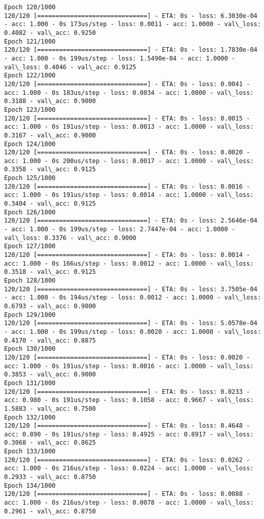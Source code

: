 \documentclass[11pt]{article}
\begin{document}
\begin{Verbatim}[commandchars=\\\{\}]
Epoch 120/1000
120/120 [==============================] - ETA: 0s - loss: 6.3030e-04 - acc: 1.000 - 0s 173us/step - loss: 0.0011 - acc: 1.0000 - val\_loss: 0.4082 - val\_acc: 0.9250
Epoch 121/1000
120/120 [==============================] - ETA: 0s - loss: 1.7830e-04 - acc: 1.000 - 0s 199us/step - loss: 1.5490e-04 - acc: 1.0000 - val\_loss: 0.4046 - val\_acc: 0.9125
Epoch 122/1000
120/120 [==============================] - ETA: 0s - loss: 0.0041 - acc: 1.000 - 0s 183us/step - loss: 0.0034 - acc: 1.0000 - val\_loss: 0.3188 - val\_acc: 0.9000
Epoch 123/1000
120/120 [==============================] - ETA: 0s - loss: 0.0015 - acc: 1.000 - 0s 191us/step - loss: 0.0013 - acc: 1.0000 - val\_loss: 0.3167 - val\_acc: 0.9000
Epoch 124/1000
120/120 [==============================] - ETA: 0s - loss: 0.0020 - acc: 1.000 - 0s 200us/step - loss: 0.0017 - acc: 1.0000 - val\_loss: 0.3358 - val\_acc: 0.9125
Epoch 125/1000
120/120 [==============================] - ETA: 0s - loss: 0.0016 - acc: 1.000 - 0s 191us/step - loss: 0.0014 - acc: 1.0000 - val\_loss: 0.3404 - val\_acc: 0.9125
Epoch 126/1000
120/120 [==============================] - ETA: 0s - loss: 2.5646e-04 - acc: 1.000 - 0s 199us/step - loss: 2.7447e-04 - acc: 1.0000 - val\_loss: 0.3376 - val\_acc: 0.9000
Epoch 127/1000
120/120 [==============================] - ETA: 0s - loss: 0.0014 - acc: 1.000 - 0s 166us/step - loss: 0.0012 - acc: 1.0000 - val\_loss: 0.3518 - val\_acc: 0.9125
Epoch 128/1000
120/120 [==============================] - ETA: 0s - loss: 3.7505e-04 - acc: 1.000 - 0s 194us/step - loss: 0.0012 - acc: 1.0000 - val\_loss: 0.6793 - val\_acc: 0.9000
Epoch 129/1000
120/120 [==============================] - ETA: 0s - loss: 5.0578e-04 - acc: 1.000 - 0s 199us/step - loss: 0.0020 - acc: 1.0000 - val\_loss: 0.4170 - val\_acc: 0.8875
Epoch 130/1000
120/120 [==============================] - ETA: 0s - loss: 0.0020 - acc: 1.000 - 0s 191us/step - loss: 0.0016 - acc: 1.0000 - val\_loss: 0.3853 - val\_acc: 0.9000
Epoch 131/1000
120/120 [==============================] - ETA: 0s - loss: 0.0233 - acc: 0.980 - 0s 191us/step - loss: 0.1058 - acc: 0.9667 - val\_loss: 1.5883 - val\_acc: 0.7500
Epoch 132/1000
120/120 [==============================] - ETA: 0s - loss: 0.4648 - acc: 0.890 - 0s 191us/step - loss: 0.4925 - acc: 0.8917 - val\_loss: 0.3068 - val\_acc: 0.8625
Epoch 133/1000
120/120 [==============================] - ETA: 0s - loss: 0.0262 - acc: 1.000 - 0s 216us/step - loss: 0.0224 - acc: 1.0000 - val\_loss: 0.2933 - val\_acc: 0.8750
Epoch 134/1000
120/120 [==============================] - ETA: 0s - loss: 0.0088 - acc: 1.000 - 0s 216us/step - loss: 0.0078 - acc: 1.0000 - val\_loss: 0.2961 - val\_acc: 0.8750

\end{Verbatim}
\end{document}
